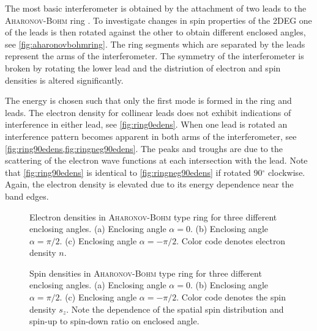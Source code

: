 The most basic interferometer is obtained by the attachment of two leads to the \textsc{Aharonov-Bohm} ring \cite{PhysRevLett.79.273}. To investigate changes in spin properties of the 2DEG one of the leads is then rotated against the other to obtain different enclosed angles, see \cref{fig:aharonovbohmring}. The ring segments which are separated by the leads represent the arms of the interferometer. The symmetry of the interferometer is broken by rotating the lower lead and the distriution of electron and spin densities is altered significantly.\par
The energy is chosen such that only the first mode is formed in the ring and leads. The electron density for collinear leads does not exhibit indications of interference in either lead, see \cref{fig:ring0edens}. When one lead is rotated an interference pattern becomes apparent in both arms of the interferometer, see \cref{fig:ring90edens,fig:ringneg90edens}. The peaks and troughs are due to the scattering of the electron wave functions at each intersection with the lead. Note that \cref{fig:ring90edens} is identical to \cref{fig:ringneg90edens} if rotated 90$^{\circ}$ clockwise. Again, the electron density is elevated due to its energy dependence near the band edges.\par
\begin{figure}[h!]
  \caption{Electron densities in \textsc{Aharonov-Bohm} type ring for three different enclosing angles. (a) Enclosing angle $\alpha=0$. (b) Enclosing angle $\alpha=\pi/2$. (c) Enclosing angle $\alpha=-\pi/2$. Color code denotes electron density $n$.} 
\end{figure}
\begin{figure}[h!]
  \caption{Spin densities in \textsc{Aharonov-Bohm} type ring for three different enclosing angles. (a) Enclosing angle $\alpha=0$. (b) Enclosing angle $\alpha=\pi/2$. (c) Enclosing angle $\alpha=-\pi/2$. Color code denotes the spin density $s_z$. Note the dependence of the spatial spin distribution and spin-up to spin-down ratio on enclosed angle.}
\end{figure}
